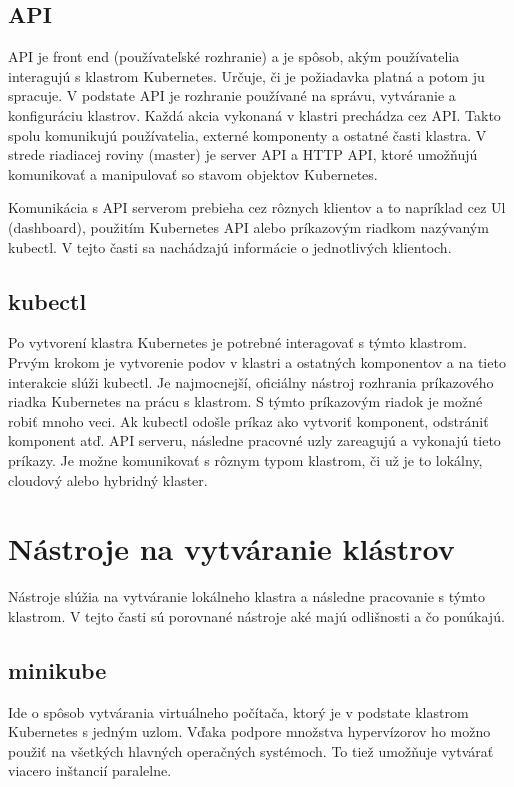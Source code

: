 \subsection{API}

API je front end (používateľské rozhranie) a je spôsob, akým používatelia interagujú s klastrom Kubernetes. Určuje, či je požiadavka platná a potom ju spracuje. V podstate API je rozhranie používané na správu, vytváranie a konfiguráciu klastrov. Každá akcia vykonaná v klastri prechádza cez API. Takto spolu komunikujú používatelia, externé komponenty a ostatné časti klastra. V strede riadiacej roviny (master) je server API a HTTP API, ktoré umožňujú komunikovať a manipulovať so stavom objektov Kubernetes.

Komunikácia s API serverom prebieha cez rôznych klientov a to napríklad cez Ul (dashboard), použitím Kubernetes API alebo príkazovým riadkom nazývaným kubectl. V tejto časti sa nachádzajú informácie o jednotlivých klientoch.

\subsection*{kubectl}

Po vytvorení klastra Kubernetes je potrebné interagovať s týmto klastrom. Prvým krokom je vytvorenie podov v klastri a ostatných komponentov a na tieto interakcie slúži kubectl. Je najmocnejší, oficiálny nástroj rozhrania príkazového riadka Kubernetes na prácu s klastrom. S týmto príkazovým riadok je možné robiť mnoho veci. Ak kubectl odošle príkaz ako vytvoriť komponent, odstrániť komponent atď. API serveru, následne pracovné uzly zareagujú a vykonajú tieto príkazy. Je možne komunikovať s rôznym typom klastrom, či už je to lokálny, cloudový alebo hybridný klaster.

\section{Nástroje na vytváranie klástrov}

Nástroje slúžia na vytváranie lokálneho klastra a následne pracovanie s týmto klastrom. V tejto časti sú porovnané nástroje aké majú odlišnosti a čo ponúkajú.
\subsection*{minikube}

Ide o spôsob vytvárania virtuálneho počítača, ktorý je v podstate klastrom Kubernetes s jedným uzlom. Vďaka podpore množstva hypervízorov ho možno použiť na všetkých hlavných operačných systémoch. To tiež umožňuje vytvárať viacero inštancií paralelne.

